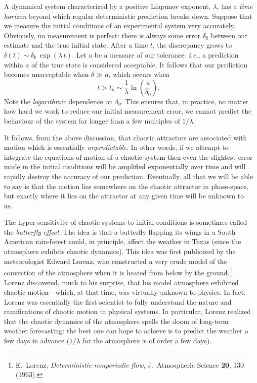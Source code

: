 A dynamical system characterized by a positive Liapunov exponent, $\lambda$,  has a {\em time horizon} beyond
which regular deterministic prediction breaks down. Suppose that we measure the initial
conditions of an experimental system very accurately. Obviously, no measurement is perfect: there
is always some error $\delta_0$ between our estimate and the true initial state. After a
time $t$, the discrepancy grows to $\delta(t)\sim \delta_0\,\exp(\lambda\,t)$. Let $a$ be
a measure of our tolerance: {\em i.e.}, a prediction within $a$ of the true state
is
considered acceptable. It follows that our prediction becomes unacceptable when
$\delta \gg a$, which occurs when
\begin{equation}
t> t_h \sim \frac{1}{\lambda}\ln\!\left(\frac{a}{\delta_0}\right).
\end{equation}
Note the {\em logarithmic} dependence on $\delta_0$. This ensures that, in practice, no matter how
hard we work to reduce our initial measurement error, we cannot predict the behaviour of
the system for longer than a few multiples of $1/\lambda$. 

It follows, from the above discussion, that chaotic attractors are associated with motion which is
essentially {\em unpredictable}. In other words, if we attempt to integrate the equations of
motion of a chaotic system then even the slightest error made in the initial conditions
will be amplified exponentially over time and will rapidly destroy the accuracy of our prediction. 
Eventually, all that we will be able to say is that the motion lies somewhere on the chaotic attractor
in phase-space, but exactly where it lies on the attractor at any given time will be unknown to
us. 

The hyper-sensitivity of chaotic systems to initial conditions  is
sometimes called the {\em butterfly effect}. The idea is that a butterfly flapping its wings
in a South American rain-forest could, in principle,  affect the weather in Texas (since the atmosphere 
exhibits chaotic dynamics). This idea was first publicized by the meteorologist Edward Lorenz,
who constructed a very crude model of the convection of the atmosphere when it is heated from
below by the ground.\footnote{E.~Lorenz, {\em Deterministic nonperiodic flow}, J.\ Atmospheric
Science {\bf 20}, 130 (1963).}
 Lorenz discovered, much to his surprise, that his model atmosphere exhibited
chaotic motion---which, at that time, was virtually unknown to physics.
 In fact, Lorenz was essentially the first
scientist to fully understand the nature and ramifications of chaotic motion in
physical systems. In particular, Lorenz realized that the chaotic dynamics of the
atmosphere spells the doom of long-term weather forecasting: the best one can hope 
to achieve is
to predict the weather a few days in advance ($1/\lambda$ for the atmosphere is of order a
few days). 


